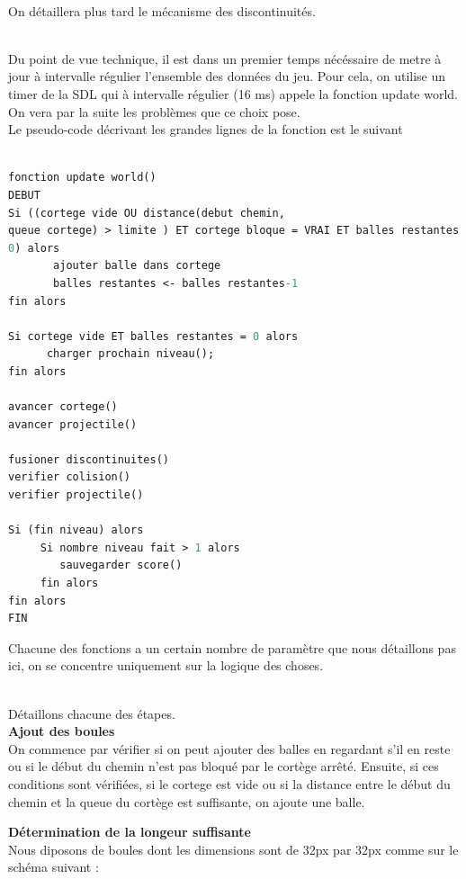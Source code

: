 ~\\
On détaillera plus tard le mécanisme des discontinuités.


~\\
Du point de vue technique, il est dans un premier temps nécéssaire de metre à jour à intervalle
régulier l'ensemble des données du jeu. Pour cela, on utilise un timer
de la SDL qui à intervalle régulier (16 ms) appele la fonction update 
\textunderscore world. On vera par la suite les problèmes que ce choix pose.
~\\

Le pseudo-code décrivant les grandes lignes de la fonction est le suivant 
\begin{lstlisting}[language=Pascal]

fonction update world()
DEBUT 
Si ((cortege vide OU distance(debut chemin,
queue cortege) > limite ) ET cortege bloque = VRAI ET balles restantes >
0) alors 
       ajouter balle dans cortege
       balles restantes <- balles restantes-1
fin alors

Si cortege vide ET balles restantes = 0 alors
      charger prochain niveau();
fin alors

avancer cortege()
avancer projectile()

fusioner discontinuites()
verifier colision()
verifier projectile()

Si (fin niveau) alors
     Si nombre niveau fait > 1 alors
        sauvegarder score()
     fin alors
fin alors
FIN
\end{lstlisting}
Chacune des fonctions a un certain nombre de paramètre que nous
détaillons pas ici, on se concentre uniquement sur la logique des choses.

~\\
Détaillons chacune des étapes.\\
\textbf{Ajout des boules} \\

On commence par vérifier si on peut ajouter des balles en regardant
s'il en reste ou si le début du chemin n'est pas bloqué par le cortège
arrêté. Ensuite, si ces conditions sont vérifiées, si le cortege est
vide ou si la distance entre le début du chemin et la queue du cortège
est suffisante, on ajoute une balle.

\textbf{Détermination de la longeur suffisante} \\
Nous diposons de boules dont les dimensions sont de 32px par 32px
comme sur le schéma suivant :

